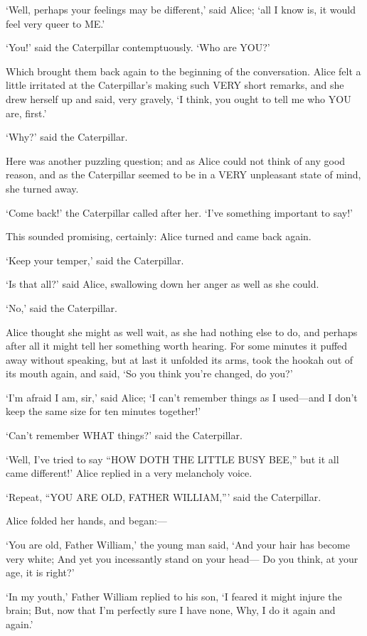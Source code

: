 \documentclass[12pt]{book}
\begin{document}
\begin{Parallel}[p]{}{}
{‘Well, perhaps your feelings may be different,’ said Alice; ‘all I know is, it would feel very queer to ME.’

‘You!’ said the Caterpillar contemptuously. ‘Who are YOU?’

Which brought them back again to the beginning of the conversation. Alice felt a little irritated at the Caterpillar’s making such VERY short remarks, and she drew herself up and said, very gravely, ‘I think, you ought to tell me who YOU are, first.’

‘Why?’ said the Caterpillar.

Here was another puzzling question; and as Alice could not think of any good reason, and as the Caterpillar seemed to be in a VERY unpleasant state of mind, she turned away.

‘Come back!’ the Caterpillar called after her. ‘I’ve something important to say!’

This sounded promising, certainly: Alice turned and came back again.

‘Keep your temper,’ said the Caterpillar.

‘Is that all?’ said Alice, swallowing down her anger as well as she could.

‘No,’ said the Caterpillar.

Alice thought she might as well wait, as she had nothing else to do, and perhaps after all it might tell her something worth hearing. For some minutes it puffed away without speaking, but at last it unfolded its arms, took the hookah out of its mouth again, and said, ‘So you think you’re changed, do you?’

‘I’m afraid I am, sir,’ said Alice; ‘I can’t remember things as I used—and I don’t keep the same size for ten minutes together!’

‘Can’t remember WHAT things?’ said the Caterpillar.

‘Well, I’ve tried to say “HOW DOTH THE LITTLE BUSY BEE,” but it all came different!’ Alice replied in a very melancholy voice.

‘Repeat, “YOU ARE OLD, FATHER WILLIAM,”’ said the Caterpillar.

Alice folded her hands, and began:—

   ‘You are old, Father William,’ the young man said,
    ‘And your hair has become very white;
   And yet you incessantly stand on your head—
    Do you think, at your age, it is right?’

   ‘In my youth,’ Father William replied to his son,
    ‘I feared it might injure the brain;
   But, now that I’m perfectly sure I have none,
    Why, I do it again and again.’

}
\end{Parallel}
\end{document}
